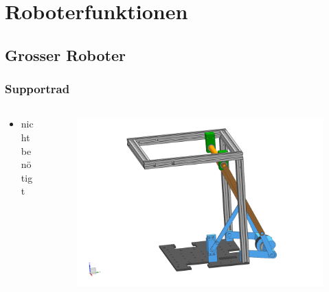 \section{Roboterfunktionen}
\subsection{Grosser Roboter}

\begin{frame}
	\frametitle{Supportrad}
	\begin{columns}
		\begin{column}{0.42 \textwidth}
			\begin{itemize}
				\item nicht benötigt
			\end{itemize}
		\end{column}
		\begin{column}{0.58 \textwidth}
			\vspace{-2.8em}
			\begin{figure}[h]
				\centering
				\includegraphics[width = 1 \textwidth]{../images/presentation/supportrad.png}
			\end{figure}
		\end{column}
	\end{columns}
\end{frame}

